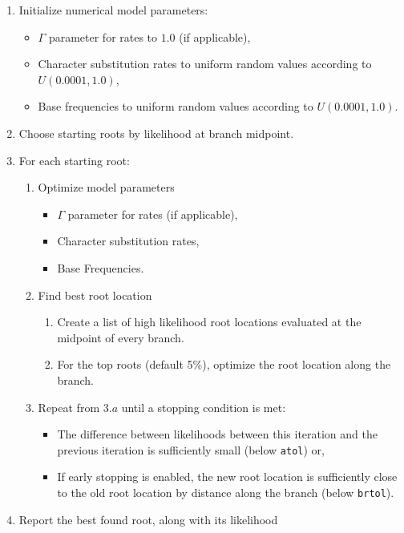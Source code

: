 \documentclass{article}
\begin{document}
\begin{enumerate}
  \item Initialize numerical model parameters:
        \begin{itemize}
          \item $\Gamma$ parameter for rates to $1.0$ (if applicable),
          \item Character substitution rates to uniform random values according
                to $U(0.0001, 1.0)$,
          \item Base frequencies to uniform random values according to
                $U(0.0001, 1.0)$.
        \end{itemize}
  \item Choose starting roots by likelihood at branch midpoint.
  \item For each starting root:
        \begin{enumerate}
          \item Optimize model parameters
                \begin{itemize}
                  \item $\Gamma$ parameter for rates (if applicable),
                  \item Character substitution rates,
                  \item Base Frequencies.
                \end{itemize}
          \item Find best root location
                \begin{enumerate}
                  \item Create a list of high likelihood root locations
                        evaluated at the midpoint of every branch.
                  \item For the top roots (default 5\%), optimize the root
                        location along the branch.
                \end{enumerate}
          \item Repeat from $3.a$ until a stopping condition is met:
                \begin{itemize}
                  \item The difference between likelihoods between this
                        iteration and the previous iteration is sufficiently
                        small (below \texttt{atol}) or,
                  \item If early stopping is enabled, the new root location is
                        sufficiently close to the old root location by distance
                        along the branch (below \texttt{brtol}).
                \end{itemize}
        \end{enumerate}
  \item Report the best found root, along with its likelihood
\end{enumerate}
\end{document}
